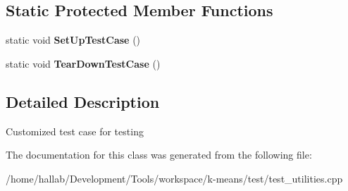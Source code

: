 \subsection*{Static Protected Member Functions}
\begin{DoxyCompactItemize}
\item 
\hypertarget{classUtilTest_ac0080980382f83fba5bdf4834196b21d}{static void {\bfseries Set\-Up\-Test\-Case} ()}\label{classUtilTest_ac0080980382f83fba5bdf4834196b21d}

\item 
\hypertarget{classUtilTest_a969e49f758a52c5385f812c55163cc6d}{static void {\bfseries Tear\-Down\-Test\-Case} ()}\label{classUtilTest_a969e49f758a52c5385f812c55163cc6d}

\end{DoxyCompactItemize}


\subsection{Detailed Description}
Customized test case for testing 

The documentation for this class was generated from the following file\-:\begin{DoxyCompactItemize}
\item 
/home/hallab/\-Development/\-Tools/workspace/k-\/means/test/test\-\_\-utilities.\-cpp\end{DoxyCompactItemize}
